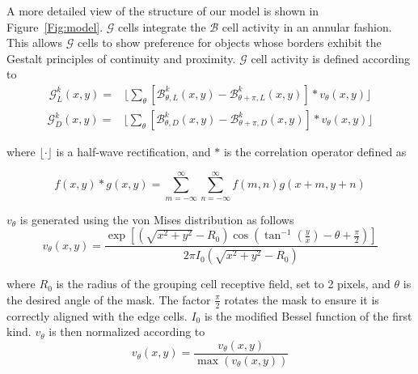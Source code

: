 A more detailed view of the structure of our model is shown in Figure~\ref{Fig:model}. $\mathcal{G}$ cells integrate the $\mathcal{B}$ cell activity in an annular fashion. This allows $\mathcal{G}$ cells to show preference for objects whose borders exhibit the Gestalt principles of continuity and proximity. $\mathcal{G}$ cell activity is defined according to
\begin{equation}
\begin{split}
\mathcal{G}_{L}^k(x,y) = &\Bigg\lfloor\sum_\theta
                     [\mathcal{B}^k_{\theta,L}(x,y)-\mathcal{B}^k_{\theta+\pi,L}(x,y)]\ast v_\theta(x,y)\Bigg\rfloor
\end{split}
\label{eq:G_L}
\end{equation}
\begin{equation}
\begin{split}
\mathcal{G}_{D}^k(x,y) = &\Bigg\lfloor\sum_\theta
                     [\mathcal{B}^k_{\theta,D}(x,y)-\mathcal{B}^k_{\theta+\pi,D}(x,y)]\ast v_\theta(x,y)\Bigg\rfloor
\end{split}
\label{eq:G_D}
\end{equation}

where $\lfloor \cdot \rfloor$ is a half-wave rectification, and $\ast$ is the correlation operator defined as

\begin{equation}
f(x,y)\ast g(x,y) = \sum_{m=-\infty}^{\infty}\sum_{n=-\infty}^{\infty}f(m,n)g(x+m,y+n)
\end{equation}

$v_{\theta}$ is generated using the von Mises distribution as follows
\begin{equation}
v_\theta(x,y) = \frac{\exp\left[(\sqrt{x^2+y^2}-R_0)\cos(\tan^{-1}(\frac{y}{x})-\theta+\frac{\pi}{2})\right]}{2\pi I_0(\sqrt{x^2+y^2}-R_0)}
\label{eq:vonMises}
\end{equation}

where $R_0$ is the radius of the grouping cell receptive field, set to 2 pixels, and $\theta$ is the desired angle of the mask. The factor $\frac{\pi}{2}$ rotates the mask to ensure it is correctly aligned with the edge cells. $I_0$ is the modified Bessel function of the first kind. $v_\theta$ is then normalized according to
\begin{equation}
v_\theta(x,y) = \frac{v_\theta(x,y)}{\max(v_\theta(x,y))}
\end{equation}

